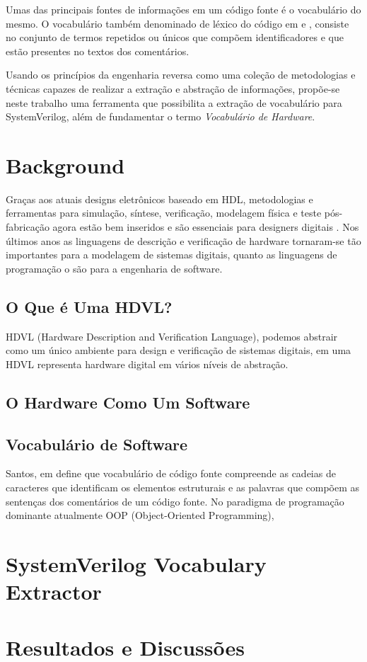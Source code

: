 \documentclass[12pt, twocolumn, a4paper]{article}
\begin{document}
Umas das principais fontes de informações em um código fonte é o vocabulário do mesmo. O vocabulário também denominado de léxico do código em \cite{Host2007} e \cite{Antoniol2007}, consiste no conjunto de termos repetidos ou únicos que compõem identificadores e que estão presentes no textos dos comentários\cite{Abebe2009}.

Usando os princípios da engenharia reversa como uma coleção de metodologias e técnicas capazes de realizar a extração e abstração de informações\cite{BENEDUSI1992225}, propõe-se neste trabalho uma ferramenta que possibilita a extração de vocabulário para SystemVerilog, além de fundamentar o termo \textit{Vocabulário de Hardware}.

	\section{Background}
\quad Graças aos atuais designs eletrônicos baseado em HDL, metodologias e ferramentas para simulação, síntese, verificação, modelagem física e teste pós-fabricação agora estão bem inseridos e são essenciais para designers digitais \cite{Navabi2015}. Nos últimos anos as linguagens de descrição e verificação de hardware tornaram-se tão importantes para a modelagem de sistemas digitais, quanto as linguagens de programação o são para a engenharia de software. 
	\subsection{O Que é Uma HDVL?}
\quad HDVL (Hardware Description and Verification Language), podemos abstrair como um único ambiente para design e verificação de sistemas digitais, em \cite{Flake} uma HDVL representa hardware digital em vários níveis de abstração.
	\subsection{O Hardware Como Um Software}
\quad 
	\subsection{Vocabulário de Software}
\quad Santos, em \cite{Santos2009} define que vocabulário de código fonte compreende as cadeias de caracteres que identificam os elementos estruturais e as palavras que compõem as sentenças dos comentários de um código fonte. No paradigma de programação dominante atualmente OOP (Object-Oriented Programming),   
	\section{SystemVerilog Vocabulary Extractor}
	\section{Resultados e Discussões}
	
	
	
\end{document}
